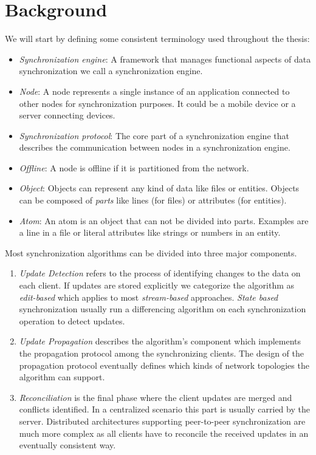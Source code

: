 
\chapter{Background}\label{background}

We will start by defining some consistent terminology used throughout the thesis:

\begin{itemize}
\item \emph{Synchronization engine}: A framework that manages functional aspects of data synchronization we call a synchronization engine.
\item \emph{Node}: A node represents a single instance of an application connected to other nodes for synchronization purposes. It could be a mobile device or a server connecting devices.
\item \emph{Synchronization protocol}: The core part of a synchronization engine that describes the communication between nodes in a synchronization engine.
\item \emph{Offline}: A node is offline if it is partitioned from the network.
\item \emph{Object}: Objects can represent any kind of data like files or entities. Objects can be composed of \emph{parts} like lines (for files) or attributes (for entities).
\item \emph{Atom}: An atom is an object that can not be divided into parts. Examples are a line in a file or literal attributes like strings or numbers in an entity.
\end{itemize}

Most synchronization algorithms can be divided into three major components.
\begin{enumerate}
\item \emph{Update Detection} refers to the process of identifying changes to the data on each client.
If updates are  stored explicitly we categorize the algorithm as \emph{edit-based} which applies to most \emph{stream-based} approaches.
\emph{State based} synchronization usually run a differencing algorithm on each synchronization operation to detect updates.
\item \emph{Update Propagation} describes the algorithm's component which implements the propagation protocol among the synchronizing clients.
The design of the propagation protocol eventually defines which kinds of network topologies the algorithm can support.
\item \emph{Reconciliation} is the final phase where the client updates are merged and conflicts identified.
In a centralized scenario this part is usually carried by the server.
Distributed architectures supporting peer-to-peer synchronization are much more complex as all clients have to reconcile the received updates in an eventually consistent way.
\end{enumerate}

